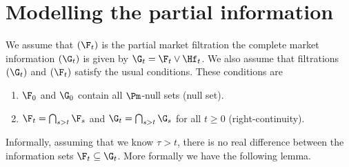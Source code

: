 \section{Modelling the partial information}

We assume that $(\F_t)$ is the partial market filtration the complete market information $(\G_t)$ is given by $\G_t = \F_t \vee \Hf_t$. We also assume that filtrations $(\G_t)$ and $(\F_t)$ satisfy the usual conditions. These conditions are
  \begin{enumerate}[labelindent=\parindent, leftmargin=*]
    \item $\F_0$ and $\G_0$ contain all $\Pm$-null sets (null set). 
    \item $\F_t = \bigcap_{s>t} \F_s$ and $\G_t = \bigcap_{s>t} \G_s$ for all $t \geq 0$ (right-continuity).
  \end{enumerate}

Informally, assuming that we know $\tau > t$, there is no real difference between the information sets $\F_t \subseteq \G_t$. More formally we have the following lemma.




